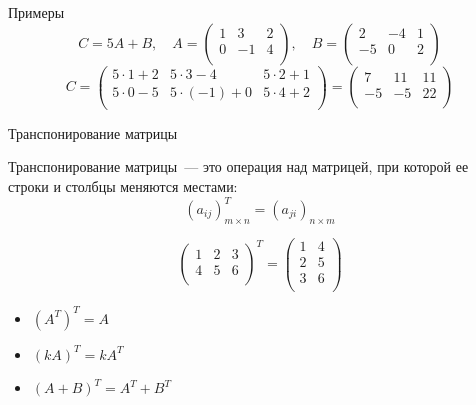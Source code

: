 \documentclass[unicode,11pt,notheorems]{beamer}
\begin{document}
\begin{frame}{Примеры}
	$$
		C=5A+B,\quad 
		A=\begin{pmatrix}
			1 & 3& 2\\
			0 & -1 & 4\\	
		\end{pmatrix},\quad
		B=\begin{pmatrix}
			2 & -4& 1\\
			-5 & 0 & 2\\	
		\end{pmatrix}
	$$	
	$$
		C
		=\begin{pmatrix}
			5\cdot 1+2 & 5\cdot 3 -4 & 5\cdot 2 + 1\\
			5\cdot 0 -5 & 5\cdot(-1)+0 & 5\cdot 4 + 2\\	
		\end{pmatrix}
		=\begin{pmatrix}
			7 & 11 & 11\\
			-5 & -5 & 22\\	
		\end{pmatrix}
	$$	
\end{frame}

\begin{frame}{Транспонирование матрицы}

	\begin{block}{}
		\alert{Транспонирование матрицы}~--- это операция над матрицей, при которой ее строки и столбцы меняются местами:
		$$
		(a_{ij})^T_{m\times n} = (a_{ji})_{n\times m} 
		$$
	\end{block}
$$
\begin{pmatrix}
1 & 2 & 3 \\
4 & 5 & 6 \\
\end{pmatrix}^T=
\begin{pmatrix}
1 & 4 \\
2 & 5 \\
3 & 6 \\
\end{pmatrix}
$$

\begin{itemize}
\item 
    $(A^T)^T = A$
\item 
    $(kA)^T = kA^T$
\item 
    $(A + B)^T = A^T + B^T$
\end{itemize}
\end{frame}
\end{document}
